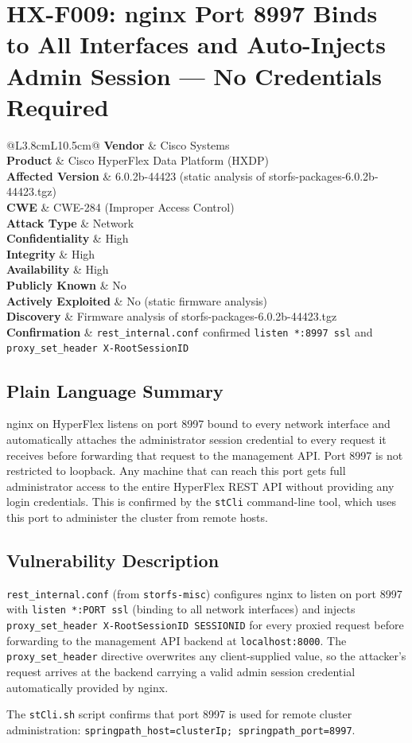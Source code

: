 \documentclass[11pt,a4paper]{article}
\makeatletter
\newcommand{\findingmeta}[9]{%
\begin{tabular}{@{}L{3.8cm}L{10.5cm}@{}}
\textbf{Vendor}             & Cisco Systems \\
\textbf{Product}            & Cisco HyperFlex Data Platform (HXDP) \\
\textbf{Affected Version}   & 6.0.2b-44423 (static analysis of storfs-packages-6.0.2b-44423.tgz) \\
\textbf{CWE}                & #1 \\
\textbf{Attack Type}        & #2 \\
\textbf{Confidentiality}    & #3 \\
\textbf{Integrity}          & #4 \\
\textbf{Availability}       & #5 \\
\textbf{Publicly Known}     & #6 \\
\textbf{Actively Exploited} & #7 \\
\textbf{Discovery}          & #8 \\
\textbf{Confirmation}       & #9 \\
\end{tabular}%
}
\makeatother
\begin{document}
\bigskip

\section{HX-F009: nginx Port 8997 Binds to All Interfaces and Auto-Injects Admin Session --- No Credentials Required}

\findingmeta{CWE-284 (Improper Access Control)}{Network}{High}{High}{High}{No}{No (static firmware analysis)}{Firmware analysis of storfs-packages-6.0.2b-44423.tgz}{\texttt{rest\_internal.conf} confirmed \texttt{listen *:8997 ssl} and \texttt{proxy\_set\_header X-RootSessionID}}

\subsection*{Plain Language Summary}

nginx on HyperFlex listens on port 8997 bound to every network interface and
automatically attaches the administrator session credential to every request it
receives before forwarding that request to the management API. Port 8997 is
not restricted to loopback. Any machine that can reach this port gets full
administrator access to the entire HyperFlex REST API without providing any
login credentials. This is confirmed by the \texttt{stCli} command-line tool,
which uses this port to administer the cluster from remote hosts.

\subsection*{Vulnerability Description}

\texttt{rest\_internal.conf} (from \texttt{storfs-misc}) configures nginx to
listen on port 8997 with \texttt{listen *:PORT ssl} (binding to all network
interfaces) and injects \texttt{proxy\_set\_header X-RootSessionID SESSIONID}
for every proxied request before forwarding to the management API backend at
\texttt{localhost:8000}. The \texttt{proxy\_set\_header} directive overwrites
any client-supplied value, so the attacker's request arrives at the backend
carrying a valid admin session credential automatically provided by nginx.

The \texttt{stCli.sh} script confirms that port 8997 is used for remote
cluster administration: \texttt{springpath\_host=clusterIp; springpath\_port=8997}.
\end{document}
